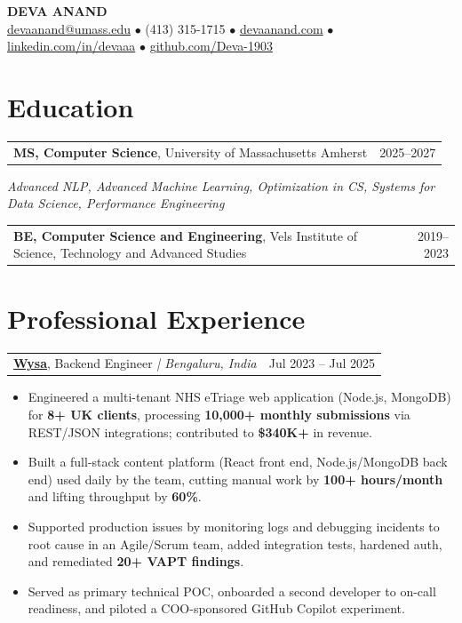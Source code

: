 \documentclass[letterpaper,11pt]{article}
\makeatletter
\newcommand{\eduItem}[3]{%
  \begin{tabular*}{\textwidth}{@{}l@{\extracolsep{\fill}}r@{}}
    \textbf{#1}, #2 & #3 \\
  \end{tabular*}\par
}
\newcommand{\expItem}[4]{%
  \vspace{3pt}
  \begin{tabular*}{\textwidth}{@{}l@{\extracolsep{\fill}}r@{}}
    \textbf{#1}, #2 \textit{| #3} & #4 \\
  \end{tabular*}\par\vspace{-2pt}
}
\makeatother
\begin{document}
\begin{center}
    {\fontsize{18}{20}\selectfont\bfseries DEVA ANAND}\\ \vspace{3pt}
    {\small
    \href{mailto:devaanand@umass.edu}{devaanand@umass.edu}
    \enspace$\bullet$\enspace
    (413) 315-1715
    \enspace$\bullet$\enspace
    \href{https://devaanand.com}{devaanand.com}
    \enspace$\bullet$\enspace
    \href{https://linkedin.com/in/devaaa/}{linkedin.com/in/devaaa}
    \enspace$\bullet$\enspace
    \href{https://github.com/Deva-1903}{github.com/Deva-1903}}
\end{center}
\vspace{-6pt}

\section{Education}
\eduItem{MS, Computer Science}{University of Massachusetts Amherst}{2025--2027}
{\small\textit{Advanced NLP, Advanced Machine Learning, Optimization in CS, Systems for Data Science, Performance Engineering}}\par
\vspace{3pt}
\eduItem{BE, Computer Science and Engineering}{Vels Institute of Science, Technology and Advanced Studies}{2019--2023}

\section{Professional Experience}

\expItem{\href{https://www.wysa.io}{Wysa}}{Backend Engineer}{Bengaluru, India}{Jul 2023 -- Jul 2025}
\begin{itemize}
  \item Engineered a multi-tenant NHS eTriage web application (Node.js, MongoDB) for \textbf{8+ UK clients}, processing \textbf{10{,}000+ monthly submissions} via REST/JSON integrations; contributed to \textbf{\$340K+} in revenue.
  \item Built a full-stack content platform (React front end, Node.js/MongoDB back end) used daily by the team, cutting manual work by \textbf{100+ hours/month} and lifting throughput by \textbf{60\%}.
  \item Supported production issues by monitoring logs and debugging incidents to root cause in an Agile/Scrum team, added integration tests, hardened auth, and remediated \textbf{20+ VAPT findings}.
  \item Served as primary technical POC, onboarded a second developer to on-call readiness, and piloted a COO-sponsored GitHub Copilot experiment.
\end{itemize}
\end{document}
